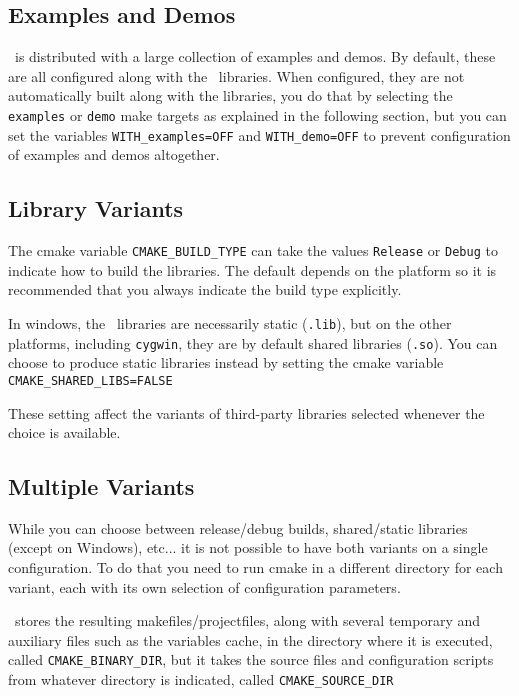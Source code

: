 \subsection{Examples and Demos}

\cgal\ is distributed with a large collection of examples and demos. By default, these are all configured along with
the \cgal\ libraries. When configured, they are not automatically built along with the libraries, you do that
by selecting the \texttt{examples} or \texttt{demo} make targets as explained in the following section, but you can set the 
variables {\tt WITH\_examples=OFF} and {\tt WITH\_demo=OFF} to prevent configuration of examples and demos altogether.


\subsection{Library Variants}

The cmake variable \texttt{CMAKE\_BUILD\_TYPE} can take the values \texttt{Release} or \texttt{Debug} to indicate how to build
the libraries. The default depends on the platform so it is recommended that you always indicate the build type explicitly.

In windows, the \cgal\ libraries are necessarily static
({\tt .lib}), but on the other platforms, including \texttt{cygwin}, they are by default shared libraries ({\tt .so}).
You can choose to produce static libraries instead by setting the cmake variable {\tt CMAKE\_SHARED\_LIBS=FALSE} 

These setting affect the variants of third-party libraries selected whenever the choice is available.

\subsection{Multiple Variants}\label{sec:cmake-out-of-source}

While you can choose between release/debug builds, shared/static libraries
(except on Windows), etc...
it is not possible to have both variants on a single configuration. To do that you need to run cmake in a 
different directory for each variant, each with its own selection of configuration parameters.

\cmake\ stores the resulting makefiles/projectfiles, along with several temporary and auxiliary files such
as the variables cache, in the directory where it is executed, called \texttt{CMAKE\_BINARY\_DIR}, but it
takes the source files and configuration scripts from whatever directory is indicated, called
\texttt{CMAKE\_SOURCE\_DIR} 

